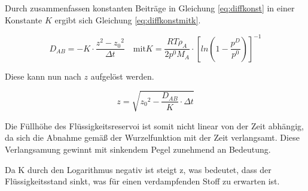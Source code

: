 Durch zusammenfassen konstanten Beiträge in Gleichung \ref{eq:diffkonst} in einer Konstante $K$ ergibt sich Gleichung \ref{eq:diffkonstmitk}.

\begin {equation}
D_{AB}=-K\cdot\frac{z^2-{z_0}^2}{\Delta t} \quad \text{mit} K=\frac{RT\rho_A}{2p^0M_A} \cdot\left[ln\left(1-\frac{p^D}{p^0}\right)\right]^{-1}
\label{eq:diffkonstmitk}
\end{equation}

Diese kann nun nach $z$ aufgelöst werden.

\begin {equation}
z=\sqrt{{z_0}^2-\frac{D_{AB}}{K}\cdot\Delta t} 
\label{eq:laenge}
\end{equation}


Die Füllhöhe des Flüssigkeitsreservoi ist somit nicht linear von der Zeit abhängig, da sich die Abnahme gemäß der Wurzelfunktion mit der Zeit verlangsamt. Diese Verlangsamung gewinnt mit sinkendem Pegel zunehmend an Bedeutung.

Da K durch den Logarithmus negativ ist steigt z, was bedeutet, dass der Flüssigkeitsstand sinkt, was für einen verdampfenden Stoff zu erwarten ist.






